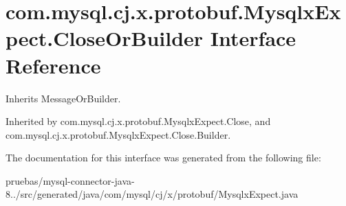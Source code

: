 \hypertarget{interfacecom_1_1mysql_1_1cj_1_1x_1_1protobuf_1_1_mysqlx_expect_1_1_close_or_builder}{}\section{com.\+mysql.\+cj.\+x.\+protobuf.\+Mysqlx\+Expect.\+Close\+Or\+Builder Interface Reference}
\label{interfacecom_1_1mysql_1_1cj_1_1x_1_1protobuf_1_1_mysqlx_expect_1_1_close_or_builder}


Inherits Message\+Or\+Builder.



Inherited by com.\+mysql.\+cj.\+x.\+protobuf.\+Mysqlx\+Expect.\+Close, and com.\+mysql.\+cj.\+x.\+protobuf.\+Mysqlx\+Expect.\+Close.\+Builder.



The documentation for this interface was generated from the following file\+:\begin{DoxyCompactItemize}
\item 
pruebas/mysql-\/connector-\/java-\/8../src/generated/java/com/mysql/cj/x/protobuf/Mysqlx\+Expect.\+java\end{DoxyCompactItemize}
